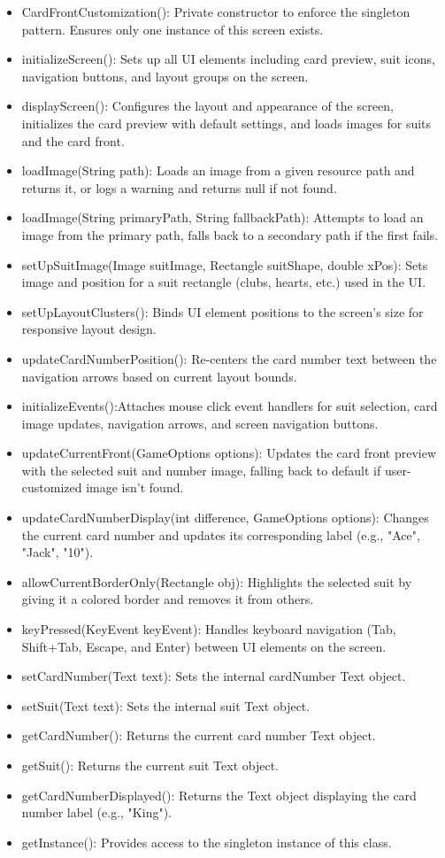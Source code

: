 \documentclass[a4paper]{project}
\begin{document}
				\begin{itemize}
					\item CardFrontCustomization(): Private constructor to enforce the singleton pattern. Ensures only one instance of this screen exists.
					\item initializeScreen(): Sets up all UI elements including card preview, suit icons, navigation buttons, and layout groups on the screen.
					\item displayScreen(): Configures the layout and appearance of the screen, initializes the card preview with default settings, and loads images for suits and the card front.
					\item loadImage(String path): Loads an image from a given resource path and returns it, or logs a warning and returns null if not found.
					\item loadImage(String primaryPath, String fallbackPath): Attempts to load an image from the primary path, falls back to a secondary path if the first fails.
					\item setUpSuitImage(Image suitImage, Rectangle suitShape, double xPos): Sets image and position for a suit rectangle (clubs, hearts, etc.) used in the UI.
					\item setUpLayoutClusters(): Binds UI element positions to the screen’s size for responsive layout design.
					\item updateCardNumberPosition(): Re-centers the card number text between the navigation arrows based on current layout bounds.
					\item initializeEvents():Attaches mouse click event handlers for suit selection, card image updates, navigation arrows, and screen navigation buttons.
					\item updateCurrentFront(GameOptions options): Updates the card front preview with the selected suit and number image, falling back to default if user-customized image isn't found.
					\item updateCardNumberDisplay(int difference, GameOptions options): Changes the current card number and updates its corresponding label (e.g., "Ace", "Jack", "10").
					\item allowCurrentBorderOnly(Rectangle obj): Highlights the selected suit by giving it a colored border and removes it from others.
					\item keyPressed(KeyEvent keyEvent): Handles keyboard navigation (Tab, Shift+Tab, Escape, and Enter) between UI elements on the screen.
					\item setCardNumber(Text text): Sets the internal cardNumber Text object.
					\item setSuit(Text text): Sets the internal suit Text object.
					\item getCardNumber(): Returns the current card number Text object.
					\item getSuit(): Returns the current suit Text object.
					\item getCardNumberDisplayed(): Returns the Text object displaying the card number label (e.g., "King").
					\item getInstance(): Provides access to the singleton instance of this class.
				\end{itemize}
				
\end{document}
